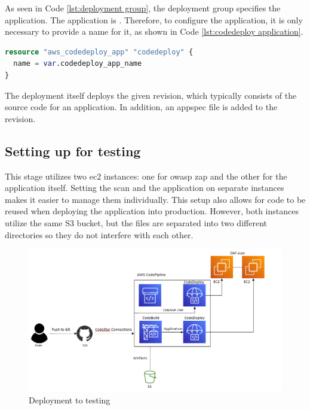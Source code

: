 As seen in Code \ref{lst:deployment group}, the deployment group specifies the application. The application is \textit{} \cite{CodeDeployApplication}. Therefore, to configure the application, it is only necessary to provide a name for it, as shown in Code \ref{lst:codedeploy application}.

\vspace{2mm}
\begin{lstlisting}[language=terraform, caption=Creation of an application for the deployment, captionpos=b, frame=single, label= lst:codedeploy application]
resource "aws_codedeploy_app" "codedeploy" {
  name = var.codedeploy_app_name
}
\end{lstlisting}

The deployment itself deploys the given revision, which typically consists of the source code for an application. In addition, an \gls{appspec} file is added to the revision. 

\subsection{Setting up for testing}

This stage utilizes two \acrshort{ec2} instances: one for \acrshort{owasp} \acrshort{zap} and the other for the application itself. Setting the scan and the application on separate instances makes it easier to manage them individually. This setup also allows for code to be reused when deploying the application into production. However, both instances utilize the same S3 bucket, but the files are separated into two different directories so they do not interfere with each other.

\vspace{2mm}
\begin{figure}[H]
    \centering
    \includegraphics[width=0.6\columnwidth]{Images/aws-piplin-5.png}
    \caption{Deployment to testing}
    \label{fig: Deployment to testing}
\end{figure}

